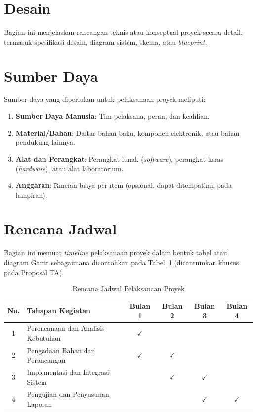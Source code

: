 \documentclass[proyek,laporan]{itkta2025}
\begin{document}
\section{Desain}
Bagian ini menjelaskan rancangan teknis atau konseptual proyek secara detail, termasuk spesifikasi desain, diagram sistem, skema, atau \textit{blueprint}.

\section{Sumber Daya}
Sumber daya yang diperlukan untuk pelaksanaan proyek meliputi:
\begin{enumerate}[label=\arabic*.]
  \item \textbf{Sumber Daya Manusia}: Tim pelaksana, peran, dan keahlian.
  \item \textbf{Material/Bahan}: Daftar bahan baku, komponen elektronik, atau bahan pendukung lainnya.
  \item \textbf{Alat dan Perangkat}: Perangkat lunak (\textit{software}), perangkat keras (\textit{hardware}), atau alat laboratorium.
  \item \textbf{Anggaran}: Rincian biaya per item (opsional, dapat ditempatkan pada lampiran).
\end{enumerate}

\section{Rencana Jadwal}
Bagian ini memuat \textit{timeline} pelaksanaan proyek dalam bentuk tabel atau diagram Gantt sebagaimana dicontohkan pada Tabel~\ref{tab:jadwal_proyek} (dicantumkan khusus pada Proposal TA).

\begin{table}[htbp]
  \centering
  \caption{Rencana Jadwal Pelaksanaan Proyek}
  \label{tab:jadwal_proyek}
  \begin{singlespace}
  \begin{tabularx}{\textwidth}{@{} c >{\raggedright\arraybackslash}X c c c c @{}}
    \toprule
    \textbf{No.} & \textbf{Tahapan Kegiatan} & \textbf{Bulan 1} & \textbf{Bulan 2} & \textbf{Bulan 3} & \textbf{Bulan 4} \\
    \midrule
    1 & Perencanaan dan Analisis Kebutuhan & $\checkmark$ &              &              &              \\
    2 & Pengadaan Bahan dan Perancangan    & $\checkmark$ & $\checkmark$ &              &              \\
    3 & Implementasi dan Integrasi Sistem  &              & $\checkmark$ & $\checkmark$ &              \\
    4 & Pengujian dan Penyusunan Laporan   &              &              & $\checkmark$ & $\checkmark$ \\
    \bottomrule
  \end{tabularx}
  \end{singlespace}
\end{table}
\end{document}

